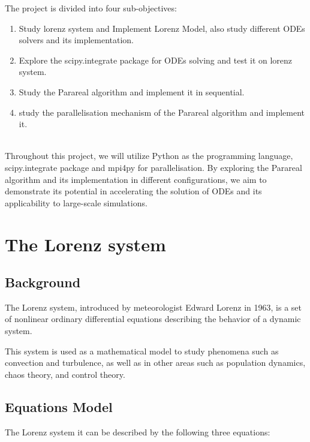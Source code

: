 \documentclass[a4paper,12pt,french]{article}
\begin{document}
The project is divided into four sub-objectives:
\begin{enumerate}
    \item Study lorenz system and Implement Lorenz Model, also study different ODEs solvers and its implementation.
    \item Explore the scipy.integrate package for ODEs solving and test it on lorenz system.
    \item Study the Parareal algorithm and implement it in sequential.
    \item study the parallelisation mechanism of the Parareal algorithm and implement it.
\end{enumerate} \\

Throughout this project, we will utilize Python as the programming language, scipy.integrate package and mpi4py for parallelisation. By exploring the Parareal algorithm and its implementation in different configurations, we aim to demonstrate its potential in accelerating the solution of ODEs and its applicability to large-scale simulations.



\newpage
\section{The Lorenz system}
\subsection{Background}


The Lorenz system\cite{lorenz1963deterministic}, introduced by meteorologist Edward Lorenz in 1963, is a set of nonlinear ordinary differential equations describing the behavior of a dynamic system. 

This system is used as a mathematical model to study phenomena such as convection and turbulence, as well as in other areas such as population dynamics, chaos theory, and control theory.

\subsection{Equations Model}

The Lorenz system it can be described by the following three equations:
\end{document}
